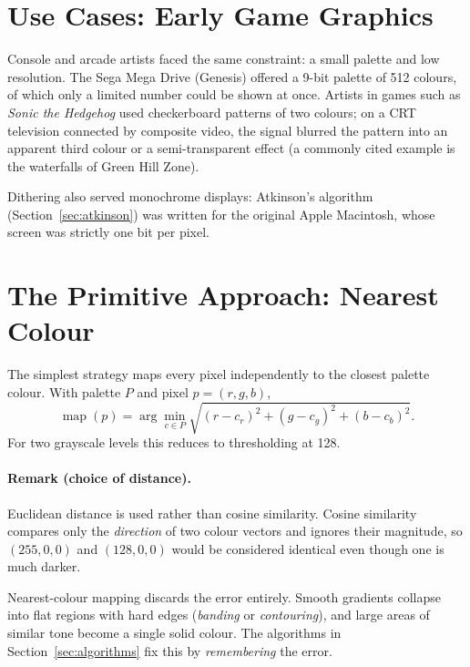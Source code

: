 \documentclass[11pt,a4paper]{article}
\begin{document}
\section{Use Cases: Early Game Graphics}
\label{sec:usecases}

Console and arcade artists faced the same constraint: a small palette and low
resolution. The Sega Mega Drive (Genesis) offered a 9-bit palette of 512
colours, of which only a limited number could be shown at once. Artists in
games such as \emph{Sonic the Hedgehog} used checkerboard patterns of two
colours; on a CRT television connected by composite video, the signal
blurred the pattern into an apparent third colour or a semi-transparent
effect (a commonly cited example is the waterfalls of Green Hill Zone).

Dithering also served monochrome displays: Atkinson's algorithm
(Section~\ref{sec:atkinson}) was written for the original Apple Macintosh,
whose screen was strictly one bit per pixel.

\section{The Primitive Approach: Nearest Colour}
\label{sec:nearest}

The simplest strategy maps every pixel independently to the closest palette
colour. With palette $P$ and pixel $p=(r,g,b)$,
\begin{equation}
  \operatorname{map}(p) = \arg\min_{c\in P}
  \sqrt{(r-c_r)^2 + (g-c_g)^2 + (b-c_b)^2}.
\end{equation}
For two grayscale levels this reduces to thresholding at 128.

\paragraph{Remark (choice of distance).}
Euclidean distance is used rather than cosine similarity. Cosine similarity
compares only the \emph{direction} of two colour vectors and ignores their
magnitude, so $(255,0,0)$ and $(128,0,0)$ would be considered identical even
though one is much darker.

Nearest-colour mapping discards the error entirely. Smooth gradients collapse
into flat regions with hard edges (\emph{banding} or \emph{contouring}), and
large areas of similar tone become a single solid colour. The algorithms in
Section~\ref{sec:algorithms} fix this by \emph{remembering} the error.
\end{document}
